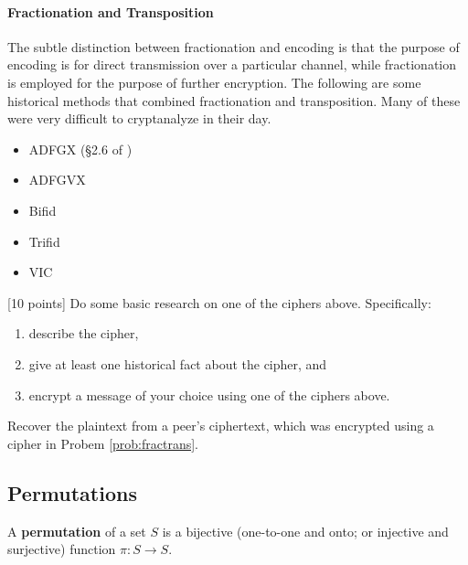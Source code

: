 	\paragraph*{Fractionation and Transposition} The subtle distinction between fractionation and encoding is that the purpose of encoding is for direct transmission over a particular channel, while fractionation is employed for the purpose of further encryption. The following are some historical methods that combined fractionation and transposition. Many of these were very difficult to cryptanalyze in their day.

		\begin{itemize}
			\item ADFGX (\S2.6 of \cite{tw})
			\item ADFGVX
			\item Bifid
			\item Trifid
			\item VIC
		\end{itemize}

\begin{problem}
\label{prob:fractrans} [10 points]
Do some basic research on one of the ciphers above. Specifically:
\begin{enumerate}
   \item describe the cipher,
   \item give at least one historical fact about the cipher, and
   \item encrypt a message of your choice using one of the ciphers above.
\end{enumerate}
\end{problem}

\begin{problem} [15 points]
Recover the plaintext from a peer's ciphertext, which was encrypted using a cipher in Probem \ref{prob:fractrans}.
\end{problem}

		\subsection{Permutations}

\begin{definition}
A {\bf permutation}  of a set $S$ is a bijective (one-to-one and onto; or injective and surjective) function $\pi: S \to S$.
\end{definition}

